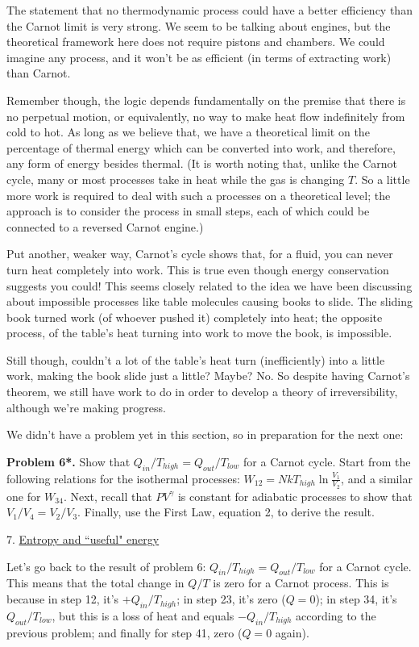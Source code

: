 \documentclass[12pt]{article}
\begin{document}
The statement that no thermodynamic process could have a better efficiency than the Carnot limit is very strong. We seem to be talking about engines, but the theoretical framework here does not require pistons and chambers. We could imagine any process, and it won't be as efficient (in terms of extracting work) than Carnot. 

Remember though, the logic depends fundamentally on the premise that there is no perpetual motion, or equivalently, no way to make heat flow indefinitely from cold to hot. As long as we believe that, we have a theoretical limit on the percentage of thermal energy which can be converted into work, and therefore, any form of energy besides thermal. (It is worth noting that, unlike the Carnot cycle, many or most processes take in heat while the gas is changing $T$. So a little more work is required to deal with such a processes on a theoretical level; the approach is to consider the process in small steps, each of which could be connected to a reversed Carnot engine.) 

Put another, weaker way, Carnot's cycle shows that, for a fluid, you can never turn heat completely into work. This is true even though energy conservation suggests you could! This seems closely related to the idea we have been discussing about impossible processes like table molecules causing books to slide. The sliding book turned work (of whoever pushed it) completely into heat; the opposite process, of the table's heat turning into work to move the book, is impossible. 

Still though, couldn't a lot of the table's heat turn (inefficiently) into a little work, making the book slide just a little? Maybe? No. So despite having Carnot's theorem, we still have work to do in order to develop a theory of irreversibility, although we're making progress.

We didn't have a problem yet in this section, so in preparation for the next one:

\textbf{Problem 6*.} Show that $Q_{in}/T_{high}=Q_{out}/T_{low}$ for a Carnot cycle. Start from the following relations for the isothermal processes: $W_{12}=NkT_{high}\ln\frac{V_1}{V_2}$, and a similar one for $W_{34}$. Next, recall that $PV^\gamma$ is constant for adiabatic processes to show that $V_1/V_4=V_2/V_3$. Finally, use the First Law, equation 2, to derive the result.

7. \underline{Entropy and ``useful" energy}

Let's go back to the result of problem 6:  $Q_{in}/T_{high}=Q_{out}/T_{low}$ for a Carnot cycle. This means that the total change in $Q/T$ is zero for a Carnot process. This is because in step 12, it's $+Q_{in}/T_{high}$; in step 23, it's zero ($Q=0$); in step 34, it's $Q_{out}/T_{low}$, but this is a loss of heat and equals $-Q_{in}/T_{high}$ according to the previous problem; and finally for step 41, zero ($Q=0$ again).
\end{document}
